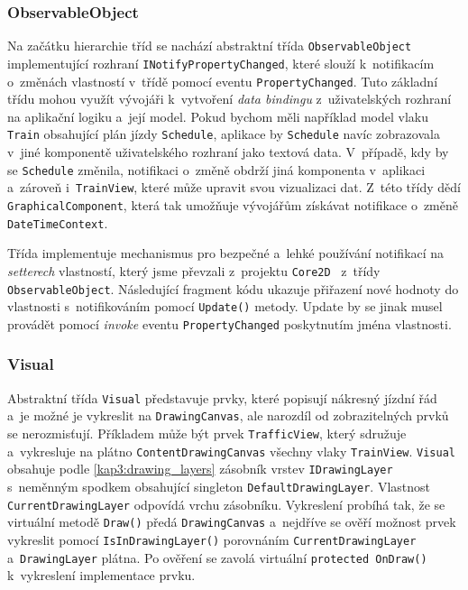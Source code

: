 \subsubsection*{ObservableObject}
\label{kap4:observable_object}
Na začátku hierarchie tříd se nachází abstraktní třída \texttt{ObservableObject} implementující rozhraní \texttt{INotifyPropertyChanged}, které slouží k~notifikacím o~změnách vlastností v~třídě pomocí eventu \texttt{PropertyChanged}. Tuto základní třídu mohou využít vývojáři k~vytvoření \textit{data bindingu} z~uživatelských rozhraní na aplikační logiku a~její model. Pokud bychom měli například model vlaku \texttt{Train} obsahující plán jízdy \texttt{Schedule}, aplikace by \texttt{Schedule} navíc zobrazovala v~jiné komponentě uživatelského rozhraní jako textová data. V~případě, kdy by se \texttt{Schedule} změnila, notifikaci o~změně obdrží jiná komponenta v~aplikaci a~zároveň i~\texttt{TrainView}, které může upravit svou vizualizaci dat. Z~této třídy dědí \texttt{GraphicalComponent}, která tak umožňuje vývojářům získávat notifikace o~změně \texttt{DateTimeContext}. 

Třída implementuje mechanismus pro bezpečné a~lehké používání notifikací na \textit{setterech} vlastností, který jsme převzali z~projektu \texttt{Core2D}~\cite{Core2D} z~třídy \linebreak\texttt{ObservableObject}. Následující fragment kódu ukazuje přiřazení nové hodnoty do vlastnosti s~notifikováním pomocí \texttt{Update()} metody. Update by se jinak musel provádět pomocí \textit{invoke} eventu \texttt{PropertyChanged} poskytnutím jména vlastnosti.

\begin{csharpcode}
public class GraphicalComponent {
	
	public DateTimeContext DateTimeContext  {
		get => _dateTimeContext;
		protected set => Update(ref _dateTimeContext, value);	
	}
	
\end{csharpcode}
\newpage
\subsubsection*{Visual}
Abstraktní třída \texttt{Visual} představuje prvky, které popisují nákresný jízdní řád a~je možné je vykreslit na \texttt{DrawingCanvas}, ale narozdíl od zobrazitelných prvků se nerozmisťují. Příkladem může být prvek \texttt{TrafficView}, který sdružuje a~vykresluje na plátno \texttt{ContentDrawingCanvas} všechny vlaky \texttt{TrainView}. \texttt{Visual} obsahuje podle \ref{kap3:drawing_layers} zásobník vrstev \texttt{IDrawingLayer} s~neměnným spodkem obsahující singleton \texttt{DefaultDrawingLayer}. Vlastnost \texttt{CurrentDrawingLayer} odpovídá vrchu zásobníku. Vykreslení probíhá tak, že se virtuální metodě \texttt{Draw()} předá \texttt{DrawingCanvas} a~nejdříve se ověří možnost prvek vykreslit pomocí \linebreak \texttt{IsInDrawingLayer()} porovnáním \texttt{CurrentDrawingLayer} a~\texttt{DrawingLayer} \linebreak plátna. Po ověření se zavolá virtuální \texttt{protected OnDraw()} k~vykreslení implementace prvku.

